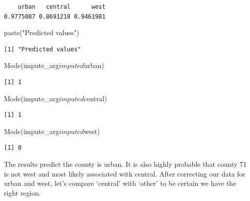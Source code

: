 \documentclass[]{article}
\newenvironment{Shaded}{}{}
\newcommand{\KeywordTok}[1]{\textcolor[rgb]{0.00,0.00,1.00}{#1}}
\newcommand{\NormalTok}[1]{#1}
\newcommand{\OperatorTok}[1]{#1}
\newcommand{\StringTok}[1]{\textcolor[rgb]{0.00,0.50,0.50}{#1}}
\begin{document}
\begin{verbatim}
    urban   central      west 
0.9775087 0.8691218 0.9461981 
\end{verbatim}

\begin{Shaded}
\begin{Highlighting}[]
\KeywordTok{paste}\NormalTok{(}\StringTok{"Predicted values"}\NormalTok{)}
\end{Highlighting}
\end{Shaded}

\begin{verbatim}
[1] "Predicted values"
\end{verbatim}

\begin{Shaded}
\begin{Highlighting}[]
\KeywordTok{Mode}\NormalTok{(impute_arg}\OperatorTok{$}\NormalTok{imputed}\OperatorTok{$}\NormalTok{urban)}
\end{Highlighting}
\end{Shaded}

\begin{verbatim}
[1] 1
\end{verbatim}

\begin{Shaded}
\begin{Highlighting}[]
\KeywordTok{Mode}\NormalTok{(impute_arg}\OperatorTok{$}\NormalTok{imputed}\OperatorTok{$}\NormalTok{central)}
\end{Highlighting}
\end{Shaded}

\begin{verbatim}
[1] 1
\end{verbatim}

\begin{Shaded}
\begin{Highlighting}[]
\KeywordTok{Mode}\NormalTok{(impute_arg}\OperatorTok{$}\NormalTok{imputed}\OperatorTok{$}\NormalTok{west)}
\end{Highlighting}
\end{Shaded}

\begin{verbatim}
[1] 0
\end{verbatim}

The results predict the county is urban. It is also highly probable that
county 71 is not west and most likely associated with central. After
correcting our data for urban and west, let's compare `central' with
`other' to be certain we have the right region.
\end{document}
